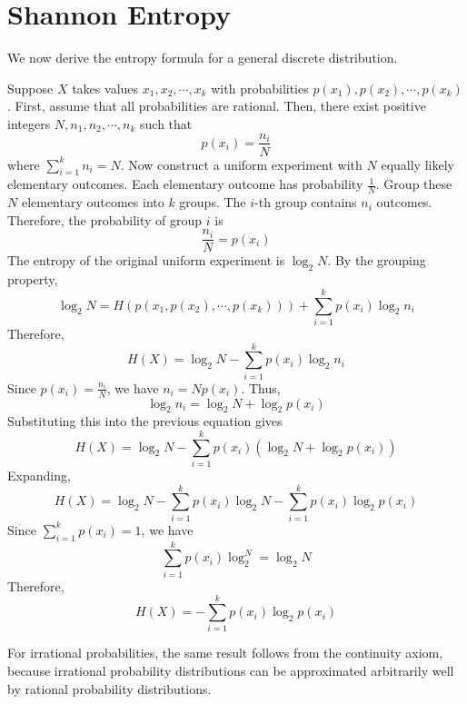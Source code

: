 \documentclass[11pt]{report}
\theoremstyle{lecturedefinition}
\theoremstyle{lectureremark}
\begin{document}
\section{Shannon Entropy}
We now derive the entropy formula for a general discrete distribution.

Suppose $X$ takes values $x_1, x_2, \cdots, x_k$ with probabilities $p(x_1), p(x_2),\cdots, p(x_k)$. First, assume that all probabilities are rational. Then, there exist positive integers $N,n_1, n_2,\cdots, n_k$ such that 
\begin{equation}
p(x_i)=\frac{n_i}{N}
\end{equation}
where $\sum_{i=1}^k n_i=N$.
Now construct a uniform experiment with $N$ equally likely elementary outcomes. Each elementary outcome has probability $\frac{1}{N}$. Group these $N$ elementary outcomes into $k$ groups. The $i$-th group contains $n_i$ outcomes. Therefore, the probability of group $i$ is
\begin{equation}
\frac{n_i}{N}=p(x_i)
\end{equation}
The entropy of the original uniform experiment is $\log_2 N$. By the grouping property,
\begin{equation}
    \log_2 N=H(p(x_1, p(x_2),\cdots, p(x_k)))+\sum_{i=1}^k p(x_i)\log_2 n_i
\end{equation}
Therefore,
\begin{equation}
    H(X)=\log_2 N-\sum_{i=1}^k p(x_i)\log_2 n_i
\end{equation}
Since $p(x_i)=\frac{n_i}{N}$, we have $n_i=Np(x_i)$. Thus,
\begin{equation}
    \log_2 n_i=\log_2 N + \log_2 p(x_i)
\end{equation}
Substituting this into the previous equation gives
\begin{equation}
    H(X)=\log_2 N-\sum_{i=1}^k p(x_i)\left(\log_2N+\log_2 p(x_i)\right)
\end{equation}
Expanding,
\begin{equation}
    H(X)=\log_2 N-\sum_{i=1}^k p(x_i)\log_2 N-\sum_{i=1}^k p(x_i)\log_2 p(x_i)
\end{equation}
Since $\sum_{i=1}^k p(x_i)=1$, we have
\begin{equation}
    \sum_{i=1}^k p(x_i)\log_2^N=\log_2 N
\end{equation}
Therefore,
\begin{equation}
    H(X)=-\sum_{i=1}^k p(x_i)\log_2 p(x_i)
\end{equation}

For irrational probabilities, the same result follows from the continuity axiom, because irrational probability distributions can be approximated arbitrarily well by rational probability distributions.
\end{document}
